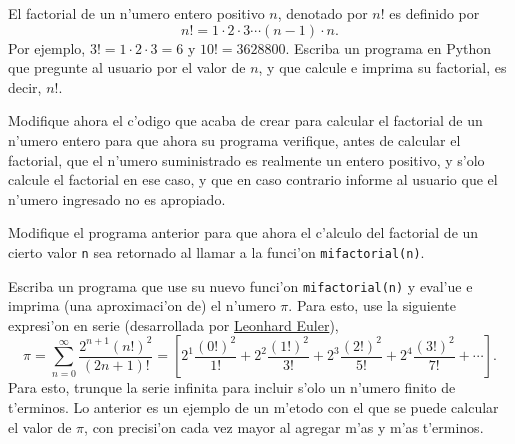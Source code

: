 \documentclass[11pt]{exam}
\begin{document}
\begin{questions}
\item El factorial de un n'umero entero positivo $n$, denotado por $n!$ es definido por
\begin{equation}
n!=1\cdot 2\cdot 3\cdots (n-1)\cdot n.
\end{equation}
Por ejemplo, $3!=1\cdot 2\cdot 3=6$ y $10!=3628800$.
Escriba un programa en Python que pregunte al usuario por el valor de $n$, y que calcule e imprima su factorial, es decir, $n!$.

\item Modifique ahora el c'odigo que acaba de crear para calcular el factorial de un n'umero entero para que ahora su programa verifique, antes de calcular el factorial, que el n'umero suministrado es realmente un entero positivo, y s'olo calcule el factorial en ese caso, y que en caso contrario informe al usuario que el n'umero ingresado no es apropiado.

\item Modifique el programa anterior para que ahora el c'alculo del factorial de un cierto valor \texttt{n} sea retornado al llamar a la funci'on \texttt{mifactorial(n)}.

\item Escriba un programa que use su nuevo funci'on \texttt{mifactorial(n)} y eval'ue e imprima (una aproximaci'on de) el n'umero $\pi$. Para esto, use la siguiente expresi'on en serie (desarrollada por \href{https://es.wikipedia.org/wiki/Leonhard_Euler}{Leonhard Euler}),
\begin{equation}
\pi = \sum_{n=0}^{\infty}\frac{2^{n+1}(n!)^2}{(2n+1)!}=\left[2^1\frac{(0!)^2}{1!} + 2^2\frac{(1!)^2}{3!} + 2^3\frac{(2!)^2}{5!} + 2^4 \frac{(3!)^2}{7!} + \cdots \right].
\end{equation}
Para esto, trunque la serie infinita para incluir s'olo un n'umero finito de t'erminos. Lo anterior es un ejemplo de un m'etodo con el que se puede calcular el valor de $\pi$, con precisi'on cada vez mayor al agregar m'as y m'as t'erminos. 

\end{questions}
\end{document}
